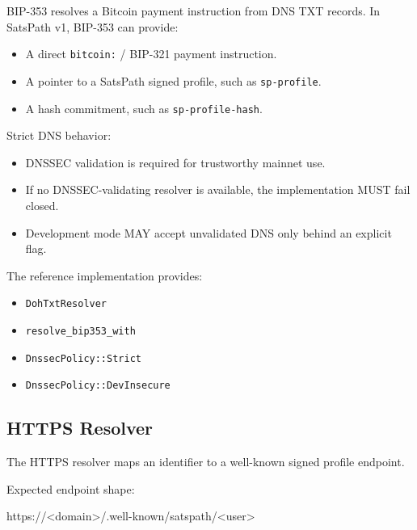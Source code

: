 \documentclass[
]{article}
\newenvironment{Shaded}{}{}
\newcommand{\NormalTok}[1]{#1}
\providecommand{\tightlist}{%
  \setlength{\itemsep}{0pt}\setlength{\parskip}{0pt}}
\begin{document}
BIP-353 resolves a Bitcoin payment instruction from DNS TXT records. In
SatsPath v1, BIP-353 can provide:

\begin{itemize}
\tightlist
\item
  A direct \texttt{bitcoin:} / BIP-321 payment instruction.
\item
  A pointer to a SatsPath signed profile, such as \texttt{sp-profile}.
\item
  A hash commitment, such as \texttt{sp-profile-hash}.
\end{itemize}

Strict DNS behavior:

\begin{itemize}
\tightlist
\item
  DNSSEC validation is required for trustworthy mainnet use.
\item
  If no DNSSEC-validating resolver is available, the implementation MUST
  fail closed.
\item
  Development mode MAY accept unvalidated DNS only behind an explicit
  flag.
\end{itemize}

The reference implementation provides:

\begin{itemize}
\tightlist
\item
  \texttt{DohTxtResolver}
\item
  \texttt{resolve\_bip353\_with}
\item
  \texttt{DnssecPolicy::Strict}
\item
  \texttt{DnssecPolicy::DevInsecure}
\end{itemize}

\hypertarget{https-resolver}{%
\subsection{HTTPS Resolver}\label{https-resolver}}

The HTTPS resolver maps an identifier to a well-known signed profile
endpoint.

Expected endpoint shape:

\begin{Shaded}
\begin{Highlighting}[]
\NormalTok{https://\textless{}domain\textgreater{}/.well{-}known/satspath/\textless{}user\textgreater{}}
\end{Highlighting}
\end{Shaded}
\end{document}

